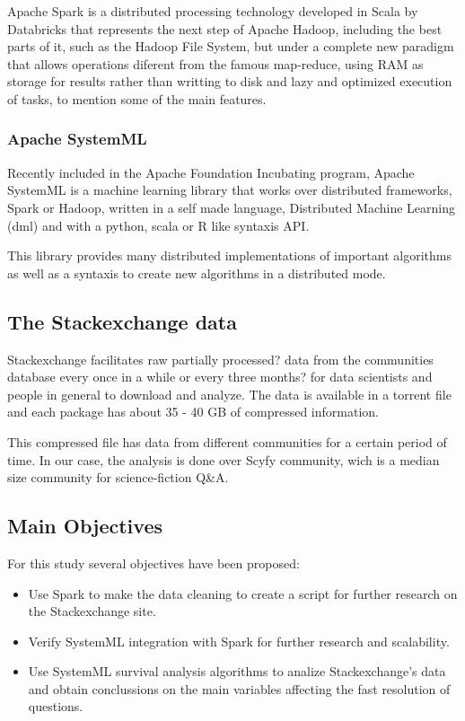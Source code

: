 \documentclass[11pt]{article} %
\begin{document}
Apache Spark is a distributed processing technology developed in Scala by Databricks that represents the next step of Apache Hadoop, including the best parts of it, such as the Hadoop File System, but under a complete new paradigm that allows operations diferent from the famous map-reduce, using RAM as storage for results rather than writting to disk and lazy and optimized execution of tasks, to mention some of the main features.

\subsubsection{Apache SystemML}

Recently included in the Apache Foundation Incubating  program, Apache SystemML is a machine learning library that works over distributed frameworks, Spark or Hadoop, written in a self made language, Distributed Machine Learning (dml) and with a python, scala or R like syntaxis API.

This library provides many distributed implementations of important algorithms as well as a syntaxis to create new algorithms in a distributed mode.

\subsection{The Stackexchange data}

Stackexchange facilitates raw {partially processed?} data from the communities database every once in a while {or every three months?} for data scientists and people in general to download and analyze. The data is available in a torrent file and each package has about 35 - 40 GB of compressed information.

This compressed file has data from different communities for a certain period of time. In our case, the analysis is done over Scyfy community, wich is a median size community for science-fiction Q\&A.

\subsection{Main Objectives}

For this study several objectives have been proposed:

\begin{itemize}

  \item Use Spark to make the data cleaning to create a script for further research on the Stackexchange site.

  \item Verify SystemML integration with Spark for further research and scalability.

  \item Use SystemML survival analysis algorithms to analize Stackexchange's data and obtain conclussions on the main variables affecting the fast resolution of questions.

\end{itemize}
\end{document}
